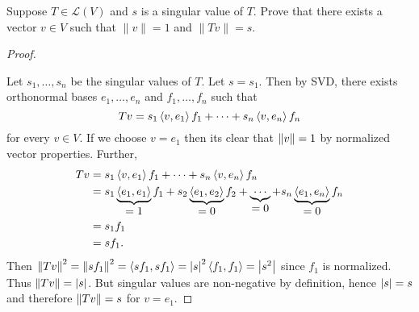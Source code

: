 Suppose $T \in \mathcal{L}(V)$ and $s$ is a singular value of $T$. Prove that there exists a vector $v \in V$ such that $\| v \| = 1$ and $\| Tv \| = s$.

\begin{proof} $ $

    \nl Let $s_1, \dots, s_n$ be the singular values of $T$. Let $s = s_1$. Then by SVD, there exists orthonormal bases $e_1, \dots, e_n$ and $f_1, \dots, f_n$ such that 
    $$Tv = s_1 \inner{v, e_1}f_1 + \cdots + s_n \inner{v,e_n}f_n$$ for every $v \in V$. If we choose $v = e_1$ then its clear that $\norm{v} = 1$ by normalized vector properties. Further, 
    \begin{align*}
        Tv &=  s_1 \inner{v, e_1}f_1 + \cdots + s_n \inner{v,e_n}f_n\\
        &=  s_1 \underbrace{ \inner{e_1, e_1} }_{\textstyle = 1} f_1 + s_2 \underbrace{\inner{e_1, e_2}}_{\textstyle = 0} f_2 + \underbrace{\cdots}_{ \textstyle = 0} + s_n \underbrace{\inner{e_1,e_n}}_{\textstyle = 0}f_n\\
        &= s_1 f_1 \\ &= s f_1.
    \end{align*}
    Then $\norm{Tv}^2 = \norm{sf_1}^2 = \inner{sf_1, sf_1} = \abs{s}^2 \inner{f_1, f_1} = \abs{s^2}$ since $f_1$ is normalized. Thus $\norm{Tv} = \abs{s}$. But singular values are non-negative by definition, hence $\abs{s} = s$ and therefore $\norm{Tv} = s$ for $v = e_1$. 
\end{proof}